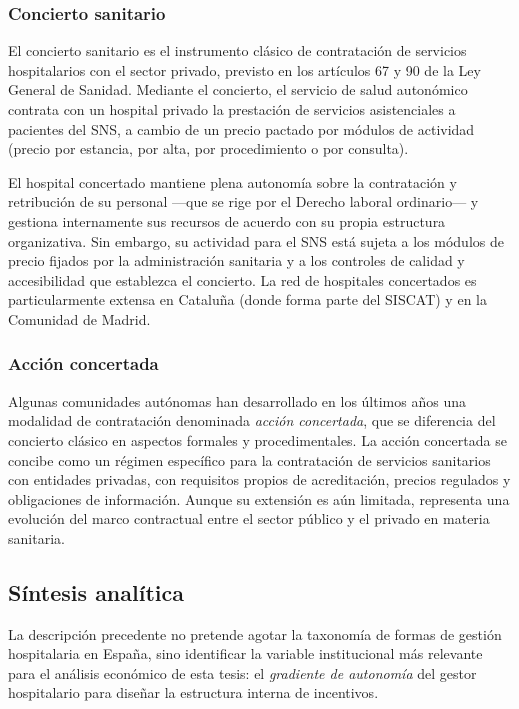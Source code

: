 \subsubsection{Concierto sanitario}

El concierto sanitario es el instrumento clásico de contratación de servicios hospitalarios con el sector privado, previsto en los artículos 67 y 90 de la Ley General de Sanidad. Mediante el concierto, el servicio de salud autonómico contrata con un hospital privado la prestación de servicios asistenciales a pacientes del SNS, a cambio de un precio pactado por módulos de actividad (precio por estancia, por alta, por procedimiento o por consulta).

El hospital concertado mantiene plena autonomía sobre la contratación y retribución de su personal ---que se rige por el Derecho laboral ordinario--- y gestiona internamente sus recursos de acuerdo con su propia estructura organizativa. Sin embargo, su actividad para el SNS está sujeta a los módulos de precio fijados por la administración sanitaria y a los controles de calidad y accesibilidad que establezca el concierto. La red de hospitales concertados es particularmente extensa en Cataluña (donde forma parte del SISCAT) y en la Comunidad de Madrid.

\subsubsection{Acción concertada}

Algunas comunidades autónomas han desarrollado en los últimos años una modalidad de contratación denominada \textit{acción concertada}, que se diferencia del concierto clásico en aspectos formales y procedimentales. La acción concertada se concibe como un régimen específico para la contratación de servicios sanitarios con entidades privadas, con requisitos propios de acreditación, precios regulados y obligaciones de información. Aunque su extensión es aún limitada, representa una evolución del marco contractual entre el sector público y el privado en materia sanitaria.

\subsection{Síntesis analítica}
\label{sec:sintesis_tipologia}

La descripción precedente no pretende agotar la taxonomía de formas de gestión hospitalaria en España, sino identificar la variable institucional más relevante para el análisis económico de esta tesis: el \textit{gradiente de autonomía} del gestor hospitalario para diseñar la estructura interna de incentivos.

